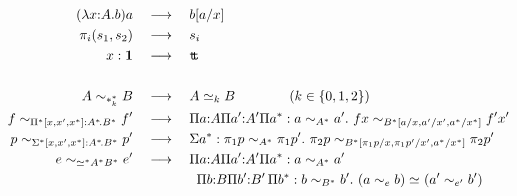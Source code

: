 \documentclass[12pt]{scrartcl}
\begin{document}
\begin{align*}
  (\lambda x{:}A.b)a &\hspace{1em}\longrightarrow\hspace{1em} b[a/x]\\
  \pi_i(s_1,s_2) &\hspace{1em}\longrightarrow\hspace{1em} s_i\\
  x : {\boldsymbol{1}} &\hspace{1em}\longrightarrow\hspace{1em} \mathtt{t}\!\!\mathtt{t}\\
\\
    A \sim_{*^*_k} B &\hspace{1em}\longrightarrow\hspace{1em} A \simeq_{k} B\qquad\qquad (k \in \{{0,1,2}\})\\
    f \sim_{\Pi^* [x,x',x^*] : A^*\!. B^*} f' &\hspace{1em}\longrightarrow\hspace{1em} \Pi a{:}A \Pi a'{:}A' \Pi a^* : a
    \sim_{A^*} a'.\ f x \sim_{B^*[a/x,a'/x',a^*/x^*]} f' x'\\
    p \sim_{\Sigma^* [x,x',x^*] : A^*\!. B^*} p' &\hspace{1em}\longrightarrow\hspace{1em} \Sigma a^* : \pi_1 p \sim_{A^*}
    \pi_1 p'.\ \pi_2 p \sim_{B^*[\pi_1 p/x, \pi_1 p'/x', a^*/x^*]}
    \pi_2 p'\\
    e \sim_{\simeq_{}^* A^* B^*} e' &\hspace{1em}\longrightarrow\hspace{1em} \Pi a {:}A \Pi a'{:}A' \Pi a^* : a
    \sim_{A^*} a'\\
    &\hspace{1.65cm} \Pi b{:}B \Pi b'{:}B' \,\Pi b^* : b \sim_{B^*}
    b'.\ (a \sim_e b) \simeq_{} (a' \sim_{e'} b')
\end{align*}
\end{document}
